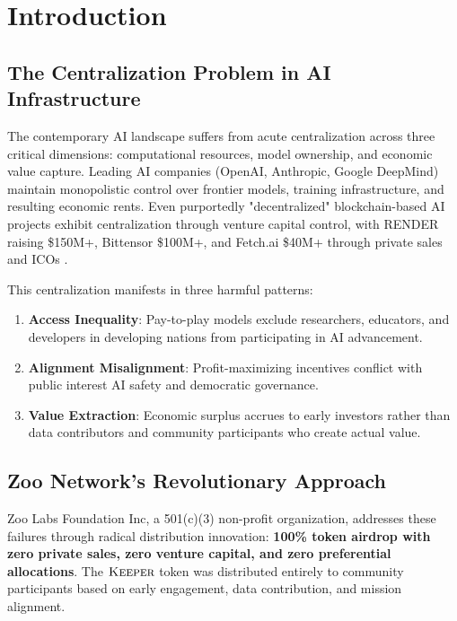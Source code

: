 \section{Introduction}


\subsection{The Centralization Problem in AI Infrastructure}

The contemporary AI landscape suffers from acute centralization across three critical dimensions: computational resources, model ownership, and economic value capture. Leading AI companies (OpenAI, Anthropic, Google DeepMind) maintain monopolistic control over frontier models, training infrastructure, and resulting economic rents. Even purportedly "decentralized" blockchain-based AI projects exhibit centralization through venture capital control, with RENDER raising \$150M+, Bittensor \$100M+, and Fetch.ai \$40M+ through private sales and ICOs \cite{messari2024ai, coindesk2024render}.

This centralization manifests in three harmful patterns:

\begin{enumerate}
\item \textbf{Access Inequality}: Pay-to-play models exclude researchers, educators, and developers in developing nations from participating in AI advancement.
\item \textbf{Alignment Misalignment}: Profit-maximizing incentives conflict with public interest AI safety and democratic governance.
\item \textbf{Value Extraction}: Economic surplus accrues to early investors rather than data contributors and community participants who create actual value.
\end{enumerate}

\subsection{Zoo Network's Revolutionary Approach}

Zoo Labs Foundation Inc, a 501(c)(3) non-profit organization, addresses these failures through radical distribution innovation: \textbf{100\% token airdrop with zero private sales, zero venture capital, and zero preferential allocations}. The $\textsc{Keeper}$ token was distributed entirely to community participants based on early engagement, data contribution, and mission alignment.

